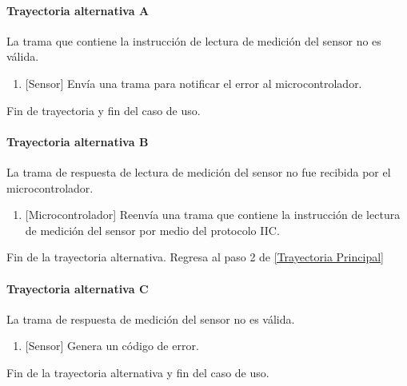 \paragraph{Trayectoria alternativa A} \label{SUB-M-CU1.3:TA}
	La trama que contiene la instrucción de lectura de medición del sensor no es válida.
	\begin{enumerate}[label=A\arabic*.]
		\item {[Sensor]} Envía una trama para notificar el error al microcontrolador.  
	\end{enumerate}
	Fin de trayectoria y fin del caso de uso.

\paragraph{Trayectoria alternativa B} \label{SUB-M-CU1.3:TB}
	La trama de respuesta de lectura de medición del sensor no fue recibida por el microcontrolador.
	\begin{enumerate}[label=B\arabic*.]
		\item {[Microcontrolador]} Reenvía una trama que contiene la instrucción de lectura de medición del sensor por medio del protocolo IIC.  
	\end{enumerate}
	Fin de la trayectoria alternativa. Regresa al paso 2 de \hyperref[SUB-M-CU1.3:TP]{[Trayectoria Principal]}  
	
\paragraph{Trayectoria alternativa C} \label{SUB-M-CU1.3:TC}
	La trama de respuesta de medición del sensor no es válida.
	\begin{enumerate}[label=C\arabic*.]
		\item {[Sensor]} Genera un código de error.
	\end{enumerate}
	Fin de la trayectoria alternativa y fin del caso de uso.  